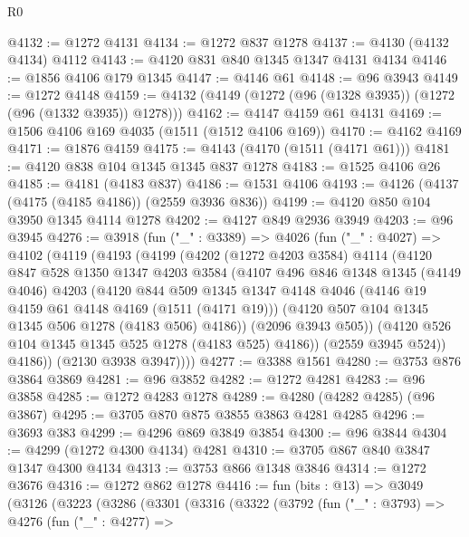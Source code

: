 \begin{lexlean}{R0}
\begin{coremodule}
@4132 := @1272 @4131
@4134 := @1272 @837 @1278
@4137 := @4130 (@4132 @4134) @4112
@4143 := @4120 @831 @840 @1345 @1347 @4131 @4134
@4146 := @1856 @4106 @179 @1345
@4147 := @4146 @61
@4148 := @96 @3943
@4149 := @1272 @4148
@4159 := @4132 (@4149 (@1272 (@96 (@1328 @3935)) (@1272 (@96 (@1332 @3935)) @1278)))
@4162 := @4147 @4159 @61 @4131
@4169 := @1506 @4106 @169 @4035 (@1511 (@1512 @4106 @169))
@4170 := @4162 @4169
@4171 := @1876 @4159
@4175 := @4143 (@4170 (@1511 (@4171 @61)))
@4181 := @4120 @838 @104 @1345 @1345 @837 @1278
@4183 := @1525 @4106 @26
@4185 := @4181 (@4183 @837)
@4186 := @1531 @4106
@4193 := @4126 (@4137 (@4175 (@4185 @4186)) (@2559 @3936 @836))
@4199 := @4120 @850 @104 @3950 @1345 @4114 @1278
@4202 := @4127 @849 @2936 @3949
@4203 := @96 @3945
@4276 := @3918
    (fun ("_" : @3389) =>
    @4026
      (fun ("_" : @4027) =>
      @4102
        (@4119
          (@4193
            (@4199
              (@4202
                (@1272 @4203 @3584)
                @4114
                (@4120
                  @847
                  @528
                  @1350
                  @1347
                  @4203
                  @3584
                  (@4107
                    @496
                    @846
                    @1348
                    @1345
                    (@4149 @4046)
                    @4203
                    (@4120
                      @844
                      @509
                      @1345
                      @1347
                      @4148
                      @4046
                      (@4146 @19 @4159 @61 @4148 @4169 (@1511 (@4171 @19)))
                      (@4120 @507 @104 @1345 @1345 @506 @1278 (@4183 @506) @4186))
                    (@2096 @3943 @505))
                  (@4120 @526 @104 @1345 @1345 @525 @1278 (@4183 @525) @4186))
                (@2559 @3945 @524))
              @4186))
          (@2130 @3938 @3947))))
@4277 := @3388 @1561
@4280 := @3753 @876 @3864 @3869
@4281 := @96 @3852
@4282 := @1272 @4281
@4283 := @96 @3858
@4285 := @1272 @4283 @1278
@4289 := @4280 (@4282 @4285) (@96 @3867)
@4295 := @3705 @870 @875 @3855 @3863 @4281 @4285
@4296 := @3693 @383
@4299 := @4296 @869 @3849 @3854
@4300 := @96 @3844
@4304 := @4299 (@1272 @4300 @4134) @4281
@4310 := @3705 @867 @840 @3847 @1347 @4300 @4134
@4313 := @3753 @866 @1348 @3846
@4314 := @1272 @3676
@4316 := @1272 @862 @1278
@4416 := fun (bits : @13) =>
  @3049
    (@3126
      (@3223
        (@3286
          (@3301
            (@3316
              (@3322
                (@3792
                  (fun ("_" : @3793) =>
                  @4276
                    (fun ("_" : @4277) =>

\end{coremodule}
\end{lexlean}
